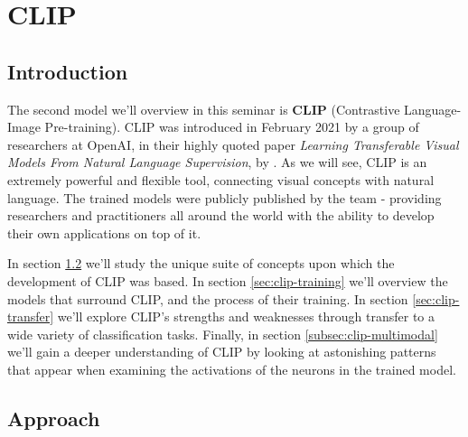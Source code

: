 \documentclass{article}
\begin{document}

\newpage
\section{CLIP}
\label{chap:clip}



\subsection{Introduction}
\label{sec:clip-intro}

The second model we'll overview in this seminar is \textbf{CLIP} (Contrastive Language-Image Pre-training). CLIP was introduced in February 2021 by a group of researchers at OpenAI, in their highly quoted paper \emph{Learning Transferable Visual Models From Natural Language Supervision}, by \citet{radford2021clip}. As we will see, CLIP is an extremely powerful and flexible tool, connecting visual concepts with natural language. The trained models were publicly published by the team - providing researchers and practitioners all around the world with the ability to develop their own applications on top of it.

\medskip
\noindent
In section \ref{sec:clip-approach} we'll study the unique suite of concepts upon which the development of CLIP was based. In section \ref{sec:clip-training} we'll overview the models that surround CLIP, and the process of their training. In section \ref{sec:clip-transfer} we'll explore CLIP's strengths and weaknesses through transfer to a wide variety of classification tasks. Finally, in section \ref{subsec:clip-multimodal} we'll gain a deeper understanding of CLIP by looking at astonishing patterns that appear when examining the activations of the neurons in the trained model.



\subsection{Approach}
\label{sec:clip-approach}
\end{document}
